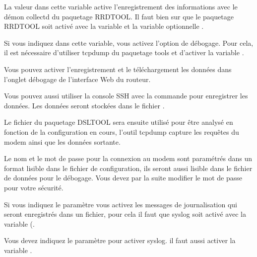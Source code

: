 \begin{description}
  La valeur  dans cette variable active l'enregistrement des
  informations avec le démon collectd du paquetage RRDTOOL. Il faut bien sur
  que le paquetage RRDTOOL soit activé avec la variable 
  et la variable optionnelle .


  Si vous indiquez  dans cette variable, vous activez l'option de débogage.
  Pour cela, il est nécessaire d'utiliser tcpdump du paquetage tools et d'activer
  la variable .

  Vous pouvez activer l'enregistrement et le téléchargement les données dans l'onglet
  débogage de l'interface Web du routeur.

  Vous pouvez aussi utiliser la console SSH avec la commande 
  pour enregistrer les données. Les données seront stockées dans le fichier .

  Le fichier  du paquetage DSLTOOL sera ensuite utilisé pour être
  analysé en fonction de la configuration en cours, l'outil tcpdump capture
  les requêtes du modem ainsi que les données sortante.

  Le nom et le mot de passe pour la connexion au modem sont paramétrés dans un format
  lisible dans le fichier de configuration, ils seront aussi lisible dans le fichier
  de données pour le débogage. Vous devez par la suite modifier le mot de passe pour
  votre sécurité.


  Si vous indiquez le paramètre  vous activez les messages de journalisation
  qui seront enregistrés dans un fichier, pour cela il faut que syslog soit activé avec
  la variable (.


  Vous devez indiquez le paramètre  pour activer syslog.
  il faut aussi activer la variable .

\end{description}

